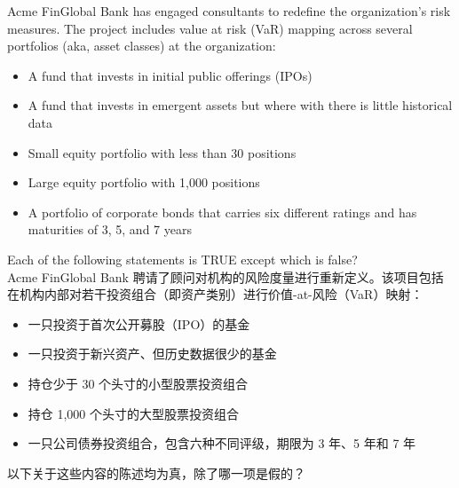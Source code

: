 \documentclass{article}
\newcounter{question} %
\begin{document}
\begin{question}
    Acme FinGlobal Bank has engaged consultants to redefine the organization’s risk measures. The project includes value at risk (VaR) mapping across several portfolios (aka, asset classes) at the organization:
    \begin{itemize}
        \item A fund that invests in initial public offerings (IPOs)
        \item A fund that invests in emergent assets but where with there is little historical data
        \item Small equity portfolio with less than 30 positions
        \item Large equity portfolio with 1,000 positions
        \item A portfolio of corporate bonds that carries six different ratings and has maturities of 3, 5, and 7 years
    \end{itemize}
    Each of the following statements is TRUE except which is false?\\
    Acme FinGlobal Bank 聘请了顾问对机构的风险度量进行重新定义。该项目包括在机构内部对若干投资组合（即资产类别）进行价值-at-风险（VaR）映射：
    \begin{itemize}
    \item 一只投资于首次公开募股（IPO）的基金
    \item 一只投资于新兴资产、但历史数据很少的基金
    \item 持仓少于 30 个头寸的小型股票投资组合
    \item 持仓 1,000 个头寸的大型股票投资组合
    \item 一只公司债券投资组合，包含六种不同评级，期限为 3 年、5 年和 7 年
    \end{itemize}
    以下关于这些内容的陈述均为真，除了哪一项是假的？
\end{question}
\end{document}
